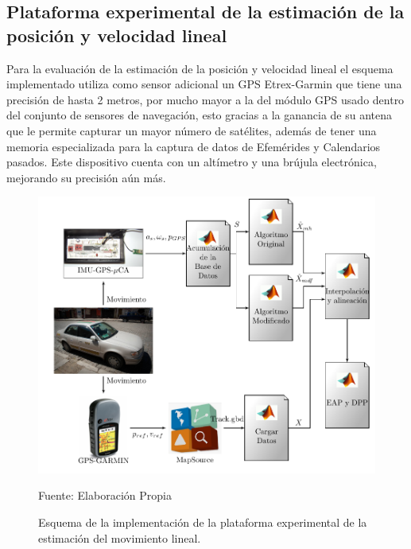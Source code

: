 \documentclass[10pt]{report}
\numberwithin{equation}{chapter}
\numberwithin{algorithm}{chapter}
\begin{document}
\subsection{Plataforma experimental de la estimación de la posición y velocidad lineal}
Para la evaluación de la estimación de la posición y velocidad lineal el esquema implementado utiliza como sensor adicional un GPS Etrex-Garmin que tiene una precisión de hasta 2 metros, por mucho mayor a la del módulo GPS usado dentro del conjunto de sensores de navegación, esto gracias a la ganancia de su antena que le permite capturar un mayor número de satélites, además de tener una memoria especializada para la captura de datos de Efemérides y Calendarios pasados. Este dispositivo cuenta con un altímetro y una brújula electrónica, mejorando su precisión aún más.\par%
\begin{figure}[t]
\centering
\includegraphics[width=\textwidth]{plataforma_fig11.pdf}
\caption{Esquema de la implementación de la plataforma experimental de la estimación del movimiento lineal.}
\scriptsize{Fuente: Elaboración Propia}
\label{plataforma_fig9}
\end{figure}
\end{document}
